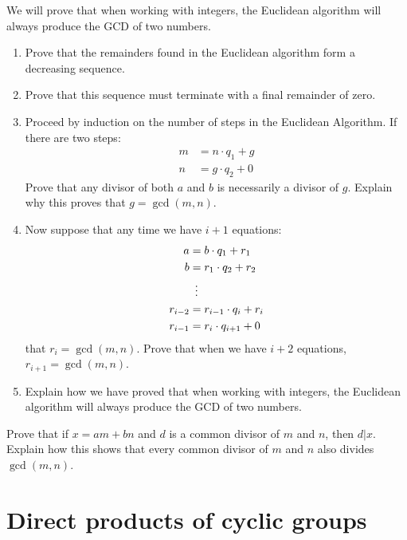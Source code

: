 \documentclass{ximera}
\begin{document}
\begin{exercise} 
We will prove that when working with integers, the Euclidean algorithm
will always produce the GCD of two numbers.
\begin{enumerate}
\item Prove that the remainders found in the Euclidean algorithm form a
  decreasing sequence.
\item Prove that this sequence must terminate with a final remainder
  of zero.
\item Proceed by induction on the number of steps in the Euclidean
  Algorithm. If there are two steps:
\begin{align*}
m &= n\cdot q_1 + g \\
n &= g\cdot q_2 +0
\end{align*}
Prove that any divisor of both $a$ and $b$ is necessarily a divisor
of $g$. Explain why this proves that $g = \gcd(m,n)$.
\item Now suppose that any time we have $i+1$ equations:
\begin{align*}
a &= b\cdot q_1 + r_1 \\
b &= r_1\cdot q_2 + r_2 \\
  &\hspace{.5em}\vdots\\
r_{i-2} &= r_{i-1}\cdot q_{i} + r_i\\
r_{i-1} &= r_{i}\cdot q_{i+1} + 0
\end{align*}
that $r_i = \gcd(m,n)$. Prove that when we have $i+2$ equations, $r_{i+1}
= \gcd(m,n)$.
\item Explain how we have proved that when working with integers, the
  Euclidean algorithm will always produce the GCD of two numbers.
\end{enumerate}
\end{exercise}


\begin{exercise} 
Prove that if $x = am +bn$ and $d$ is a common divisor of $m$ and $n$,
then $d|x$. Explain how this shows that every common divisor of $m$
and $n$ also divides $\gcd(m,n)$.
\end{exercise}







\section{Direct products of cyclic groups}
\end{document}
